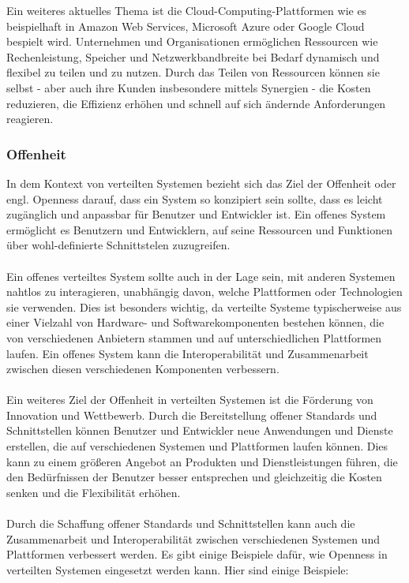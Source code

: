 \documentclass[../vs-script-first-v01.tex]{subfiles}
\begin{document}
Ein weiteres aktuelles Thema ist die Cloud-Computing-Plattformen wie es beispielhaft in Amazon Web Services, Microsoft Azure oder Google Cloud bespielt wird. Unternehmen und Organisationen ermöglichen Ressourcen wie Rechenleistung, Speicher und Netzwerkbandbreite bei Bedarf dynamisch und flexibel zu teilen und zu nutzen. Durch das Teilen von Ressourcen können sie selbst - aber auch ihre Kunden insbesondere mittels Synergien - die Kosten reduzieren, die Effizienz erhöhen und schnell auf sich ändernde Anforderungen reagieren.

\subsubsection{Offenheit}
In dem Kontext von verteilten Systemen bezieht sich das Ziel der Offenheit oder engl. Openness darauf, dass ein System so konzipiert sein sollte, dass es leicht zugänglich und anpassbar für Benutzer und Entwickler ist. Ein offenes System ermöglicht es Benutzern und Entwicklern, auf seine Ressourcen und Funktionen über wohl-definierte Schnittstelen zuzugreifen.
\\\\
Ein offenes verteiltes System sollte auch in der Lage sein, mit anderen Systemen nahtlos zu interagieren, unabhängig davon, welche Plattformen oder Technologien sie verwenden. Dies ist besonders wichtig, da verteilte Systeme typischerweise aus einer Vielzahl von Hardware- und Softwarekomponenten bestehen können, die von verschiedenen Anbietern stammen und auf unterschiedlichen Plattformen laufen. Ein offenes System kann die Interoperabilität und Zusammenarbeit zwischen diesen verschiedenen Komponenten verbessern.
\\\\
Ein weiteres Ziel der Offenheit in verteilten Systemen ist die Förderung von Innovation und Wettbewerb. Durch die Bereitstellung offener Standards und Schnittstellen können Benutzer und Entwickler neue Anwendungen und Dienste erstellen, die auf verschiedenen Systemen und Plattformen laufen können. Dies kann zu einem größeren Angebot an Produkten und Dienstleistungen führen, die den Bedürfnissen der Benutzer besser entsprechen und gleichzeitig die Kosten senken und die Flexibilität erhöhen.
\\\\
Durch die Schaffung offener Standards und Schnittstellen kann auch die Zusammenarbeit und Interoperabilität zwischen verschiedenen Systemen und Plattformen verbessert werden. Es gibt einige Beispiele dafür, wie Openness in verteilten Systemen eingesetzt werden kann. Hier sind einige Beispiele:
\end{document}
